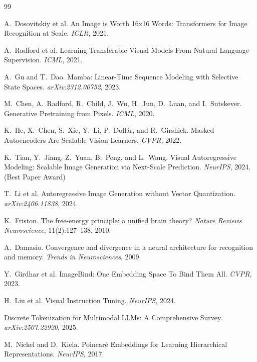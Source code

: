 \documentclass[11pt, a4paper]{article}
\theoremstyle{plain}
\theoremstyle{remark}
\begin{document}
\begin{thebibliography}{99}

A.~Dosovitskiy et al.
\newblock An Image is Worth 16x16 Words: Transformers for Image Recognition at Scale.
\newblock \emph{ICLR}, 2021.

A.~Radford et al.
\newblock Learning Transferable Visual Models From Natural Language Supervision.
\newblock \emph{ICML}, 2021.

A.~Gu and T.~Dao.
\newblock Mamba: Linear-Time Sequence Modeling with Selective State Spaces.
\newblock \emph{arXiv:2312.00752}, 2023.

M.~Chen, A.~Radford, R.~Child, J.~Wu, H.~Jun, D.~Luan, and I.~Sutskever.
\newblock Generative Pretraining from Pixels.
\newblock \emph{ICML}, 2020.

K.~He, X.~Chen, S.~Xie, Y.~Li, P.~Doll\'{a}r, and R.~Girshick.
\newblock Masked Autoencoders Are Scalable Vision Learners.
\newblock \emph{CVPR}, 2022.

K.~Tian, Y.~Jiang, Z.~Yuan, B.~Peng, and L.~Wang.
\newblock Visual Autoregressive Modeling: Scalable Image Generation via Next-Scale Prediction.
\newblock \emph{NeurIPS}, 2024. (Best Paper Award)

T.~Li et al.
\newblock Autoregressive Image Generation without Vector Quantization.
\newblock \emph{arXiv:2406.11838}, 2024.

K.~Friston.
\newblock The free-energy principle: a unified brain theory?
\newblock \emph{Nature Reviews Neuroscience}, 11(2):127--138, 2010.

A.~Damasio.
\newblock Convergence and divergence in a neural architecture for recognition and memory.
\newblock \emph{Trends in Neurosciences}, 2009.

Y.~Girdhar et al.
\newblock ImageBind: One Embedding Space To Bind Them All.
\newblock \emph{CVPR}, 2023.

H.~Liu et al.
\newblock Visual Instruction Tuning.
\newblock \emph{NeurIPS}, 2024.

Discrete Tokenization for Multimodal LLMs: A Comprehensive Survey.
\newblock \emph{arXiv:2507.22920}, 2025.

M.~Nickel and D.~Kiela.
\newblock Poincar\'{e} Embeddings for Learning Hierarchical Representations.
\newblock \emph{NeurIPS}, 2017.


\end{thebibliography}
\end{document}
